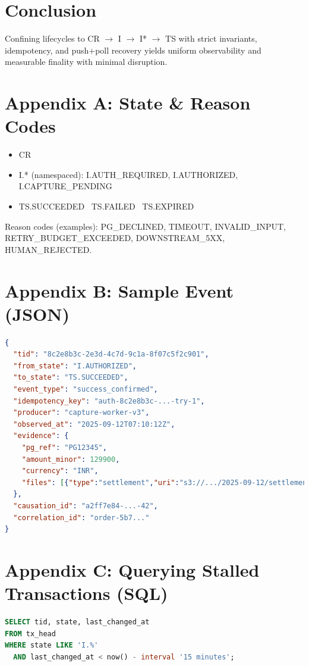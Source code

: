 \documentclass[11pt]{article}
\begin{document}
\section{Conclusion}
Confining lifecycles to CR $\to$ I $\to$ I* $\to$ TS with strict invariants, idempotency, and push+poll recovery yields uniform observability and measurable finality with minimal disruption.

\appendix
\section{Appendix A: State \& Reason Codes}
\begin{itemize}[leftmargin=*]
\item CR
\item I.* (namespaced): I.AUTH\_REQUIRED, I.AUTHORIZED, I.CAPTURE\_PENDING
\item TS.SUCCEEDED \textbar\ TS.FAILED \textbar\ TS.EXPIRED
\end{itemize}
Reason codes (examples): PG\_DECLINED, TIMEOUT, INVALID\_INPUT, RETRY\_BUDGET\_EXCEEDED, DOWNSTREAM\_5XX, HUMAN\_REJECTED.

\section{Appendix B: Sample Event (JSON)}
\begin{lstlisting}[language=json]
{
  "tid": "8c2e8b3c-2e3d-4c7d-9c1a-8f07c5f2c901",
  "from_state": "I.AUTHORIZED",
  "to_state": "TS.SUCCEEDED",
  "event_type": "success_confirmed",
  "idempotency_key": "auth-8c2e8b3c-...-try-1",
  "producer": "capture-worker-v3",
  "observed_at": "2025-09-12T07:10:12Z",
  "evidence": {
    "pg_ref": "PG12345",
    "amount_minor": 129900,
    "currency": "INR",
    "files": [{"type":"settlement","uri":"s3://.../2025-09-12/settlement.csv"}]
  },
  "causation_id": "a2ff7e84-...-42",
  "correlation_id": "order-5b7..."
}
\end{lstlisting}

\section{Appendix C: Querying Stalled Transactions (SQL)}
\begin{lstlisting}[language=SQL]
SELECT tid, state, last_changed_at
FROM tx_head
WHERE state LIKE 'I.%'
  AND last_changed_at < now() - interval '15 minutes';
\end{lstlisting}
\end{document}

